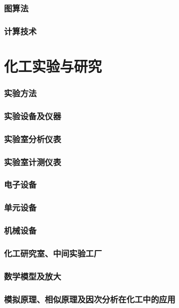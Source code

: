 \documentclass[UTF8]{../../ApplicationUniverse}
\begin{document}
    \subsubsection{图算法}
    \subsubsection{计算技术}
\section{化工实验与研究}
    \subsubsection{实验方法}
    \subsubsection{实验设备及仪器}
        \subsubsection{实验室分析仪表}
        \subsubsection{实验室计测仪表}
        \subsubsection{电子设备}
        \subsubsection{单元设备}
        \subsubsection{机械设备}
    \subsubsection{化工研究室、中间实验工厂}
\subsubsection{数学模型及放大}
\subsubsection{模拟原理、相似原理及因次分析在化工中的应用}
\end{document}
